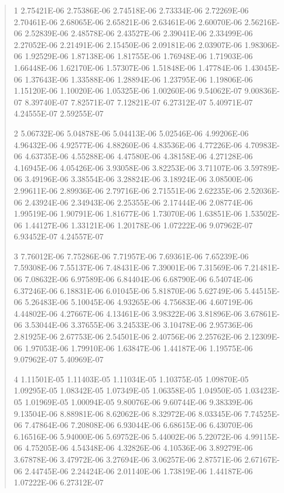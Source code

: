 \documentclass[letterpaper,10pt,english]{sphinxmanual}
\begin{document}
\begin{quote}
\begin{DUlineblock}{0em}
\item[]
\begin{DUlineblock}{\DUlineblockindent}
\item[] 1   2.75421E-06  2.75386E-06  2.74518E-06  2.73334E-06  2.72269E-06  2.70461E-06  2.68065E-06  2.65821E-06  2.63461E-06  2.60070E-06  2.56216E-06  2.52839E-06  2.48578E-06  2.43527E-06  2.39041E-06  2.33499E-06  2.27052E-06  2.21491E-06  2.15450E-06  2.09181E-06  2.03907E-06  1.98306E-06  1.92529E-06  1.87138E-06  1.81755E-06  1.76948E-06  1.71903E-06  1.66448E-06  1.62170E-06  1.57307E-06  1.51848E-06  1.47784E-06  1.43045E-06  1.37643E-06  1.33588E-06  1.28894E-06  1.23795E-06  1.19806E-06  1.15120E-06  1.10020E-06  1.05325E-06  1.00260E-06  9.54062E-07  9.00836E-07  8.39740E-07  7.82571E-07  7.12821E-07  6.27312E-07  5.40971E-07  4.24555E-07  2.59255E-07
\item[] 2   5.06732E-06  5.04878E-06  5.04413E-06  5.02546E-06  4.99206E-06  4.96432E-06  4.92577E-06  4.88260E-06  4.83536E-06  4.77226E-06  4.70983E-06  4.63735E-06  4.55288E-06  4.47580E-06  4.38158E-06  4.27128E-06  4.16945E-06  4.05426E-06  3.93058E-06  3.82253E-06  3.71107E-06  3.59789E-06  3.49196E-06  3.38554E-06  3.28824E-06  3.18924E-06  3.08500E-06  2.99611E-06  2.89936E-06  2.79716E-06  2.71551E-06  2.62235E-06  2.52036E-06  2.43924E-06  2.34943E-06  2.25355E-06  2.17444E-06  2.08774E-06  1.99519E-06  1.90791E-06  1.81677E-06  1.73070E-06  1.63851E-06  1.53502E-06  1.44127E-06  1.33121E-06  1.20178E-06  1.07222E-06  9.07962E-07  6.93452E-07  4.24557E-07
\item[] 3   7.76012E-06  7.75286E-06  7.71957E-06  7.69361E-06  7.65239E-06  7.59308E-06  7.55137E-06  7.48431E-06  7.39001E-06  7.31569E-06  7.21481E-06  7.08632E-06  6.97589E-06  6.84404E-06  6.68790E-06  6.54074E-06  6.37246E-06  6.18831E-06  6.01045E-06  5.81870E-06  5.62749E-06  5.44515E-06  5.26483E-06  5.10045E-06  4.93265E-06  4.75683E-06  4.60719E-06  4.44802E-06  4.27667E-06  4.13461E-06  3.98322E-06  3.81896E-06  3.67861E-06  3.53044E-06  3.37655E-06  3.24533E-06  3.10478E-06  2.95736E-06  2.81925E-06  2.67753E-06  2.54501E-06  2.40756E-06  2.25762E-06  2.12309E-06  1.97053E-06  1.79910E-06  1.63847E-06  1.44187E-06  1.19575E-06  9.07962E-07  5.40969E-07
\item[] 4   1.11501E-05  1.11403E-05  1.11034E-05  1.10375E-05  1.09870E-05  1.09295E-05  1.08342E-05  1.07349E-05  1.06358E-05  1.04950E-05  1.03423E-05  1.01969E-05  1.00094E-05  9.80076E-06  9.60744E-06  9.38339E-06  9.13504E-06  8.88981E-06  8.62062E-06  8.32972E-06  8.03345E-06  7.74525E-06  7.47864E-06  7.20808E-06  6.93044E-06  6.68615E-06  6.43070E-06  6.16516E-06  5.94000E-06  5.69752E-06  5.44002E-06  5.22072E-06  4.99115E-06  4.75205E-06  4.54348E-06  4.32826E-06  4.10536E-06  3.89279E-06  3.67878E-06  3.47972E-06  3.27694E-06  3.06257E-06  2.87571E-06  2.67167E-06  2.44745E-06  2.24424E-06  2.01140E-06  1.73819E-06  1.44187E-06  1.07222E-06  6.27312E-07

\end{DUlineblock}
\end{DUlineblock}
\end{quote}
\end{document}
